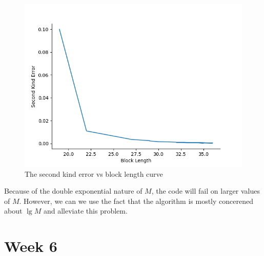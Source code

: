\documentclass{article}
\begin{document}
\begin{figure}
	\includegraphics*[height = 0.4 \textheight]{ErrorVsBlocklength.png}
	\caption{The second kind error vs block length curve}
\end{figure}

Because of the double exponential nature of \(M\), the code will fail on larger values of \(M\). However, we can we use the fact that the algorithm is mostly concerened about \(\lg M\) and alleviate this problem.

\section{Week 6}
\end{document}
